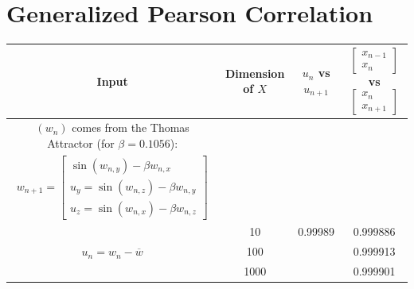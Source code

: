 \documentclass[a4paper,12pt,twoside]{report}
\begin{document}

\section{Generalized Pearson Correlation}



\begin{center}
  \begin{table} 
      \scalebox{0.75}
      {\begin{tabular}{|c|c| c c |} 
          \hline
          Input & Dimension of $X$ & $u_n$ vs $u_{n+1}$ 
          & $\begin{bmatrix}
              x_{n-1}\\
              x_n
          \end{bmatrix}$ vs $\begin{bmatrix}
              x_n\\
              x_{n+1}
          \end{bmatrix}$ \\
          \hline
          
              
          
          \hline
          $(w_n)$ comes from the Thomas Attractor (for $\beta=0.1056$): & & & \\
          {$w_{n+1}= \begin{bmatrix} \sin(w_{n,y}) - \beta{w_{n,x}} \\
              u_y = \sin(w_{n,z}) - \beta{w_{n,y}} \\
          u_z = \sin(w_{n,x}) - \beta{w_{n,z}} \end{bmatrix}$} & & & \\
          \multirow{3}{*}{$u_n = w_n - \overline{w}$}
              & 10 & 0.99989 & 0.999886 \\
              & 100 & &  0.999913 \\
              & 1000 & & 0.999901 \\
          \hline
          

\end{tabular}}
\end{table}
\end{center}
\end{document}
